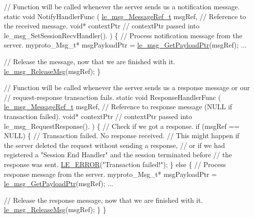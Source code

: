 \begin{DoxyCode}
\textcolor{comment}{// Function will be called whenever the server sends us a notification message.}
\textcolor{keyword}{static} \textcolor{keywordtype}{void} NotifyHandlerFunc
(
    \hyperlink{le__messaging_8h_a1e5c37fdd50a4d6d24cad82cb166f770}{le\_msg\_MessageRef\_t}  msgRef,    \textcolor{comment}{// Reference to the received message.}
    \textcolor{keywordtype}{void}*                contextPtr \textcolor{comment}{// contextPtr passed into le\_msg\_SetSessionRecvHandler().}
)
\{
    \textcolor{comment}{// Process notification message from the server.}
    myproto\_Msg\_t* msgPayloadPtr = \hyperlink{le__messaging_8h_a32d1c7ffd913db8546f6f1bd5cce58c4}{le\_msg\_GetPayloadPtr}(msgRef);
    ...

    \textcolor{comment}{// Release the message, now that we are finished with it.}
    \hyperlink{le__messaging_8h_afc508c24d0b6933e8fbc4e0410d50271}{le\_msg\_ReleaseMsg}(msgRef);
\}

\textcolor{comment}{// Function will be called whenever the server sends us a response message or our}
\textcolor{comment}{// request-response transaction fails.}
\textcolor{keyword}{static} \textcolor{keywordtype}{void} ResponseHandlerFunc
(
    \hyperlink{le__messaging_8h_a1e5c37fdd50a4d6d24cad82cb166f770}{le\_msg\_MessageRef\_t}  msgRef,    \textcolor{comment}{// Reference to response message (NULL if
       transaction failed).}
    \textcolor{keywordtype}{void}*                contextPtr \textcolor{comment}{// contextPtr passed into le\_msg\_RequestResponse().}
)
\{
    \textcolor{comment}{// Check if we got a response.}
    \textcolor{keywordflow}{if} (msgRef == NULL)
    \{
        \textcolor{comment}{// Transaction failed.  No response received.}
        \textcolor{comment}{// This might happen if the server deleted the request without sending a response,}
        \textcolor{comment}{// or if we had registered a "Session End Handler" and the session terminated before}
        \textcolor{comment}{// the response was sent.}
        \hyperlink{le__log_8h_a353590f91b3143a7ba3a416ae5a50c3d}{LE\_ERROR}(\textcolor{stringliteral}{"Transaction failed!"});
    \}
    \textcolor{keywordflow}{else}
    \{
        \textcolor{comment}{// Process response message from the server.}
        myproto\_Msg\_t* msgPayloadPtr = \hyperlink{le__messaging_8h_a32d1c7ffd913db8546f6f1bd5cce58c4}{le\_msg\_GetPayloadPtr}(msgRef);
        ...

        \textcolor{comment}{// Release the response message, now that we are finished with it.}
        \hyperlink{le__messaging_8h_afc508c24d0b6933e8fbc4e0410d50271}{le\_msg\_ReleaseMsg}(msgRef);
    \}
\}


\end{DoxyCode}

